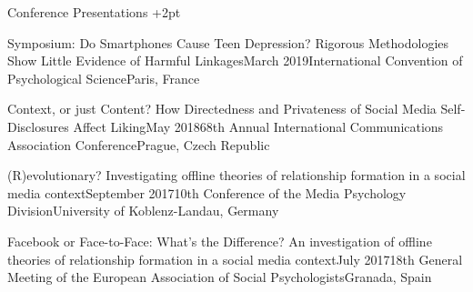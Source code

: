 \documentclass{resume} %
\begin{document}
\begin{rSection}{Conference Presentations} \itemsep +2pt

\begin{rSubsection}{Symposium: Do Smartphones Cause Teen Depression? Rigorous Methodologies Show Little Evidence of Harmful Linkages}{March 2019}{International Convention of Psychological Science}{Paris, France}
\item[]\vspace{-1.5\baselineskip}
\end{rSubsection}


\begin{rSubsection}{Context, or just Content? How Directedness and Privateness of Social Media Self-Disclosures Affect Liking}{May 2018}{68th Annual International Communications Association Conference}{Prague, Czech Republic}
\item[]\vspace{-1.5\baselineskip}
\end{rSubsection}


\begin{rSubsection}{(R)evolutionary? Investigating offline theories of relationship formation in a social media context}{September 2017}{10th Conference of the Media Psychology Division}{University of Koblenz-Landau, Germany}
\item[]\vspace{-1.5\baselineskip}
\end{rSubsection}


\begin{rSubsection}{Facebook or Face-to-Face: What’s the Difference? An investigation of offline theories of relationship formation in a social media context}{July 2017}{18th General Meeting of the European Association of Social Psychologists}{Granada, Spain}
\item[]\vspace{-1.5\baselineskip}
\end{rSubsection}



\end{rSection}
\end{document}

